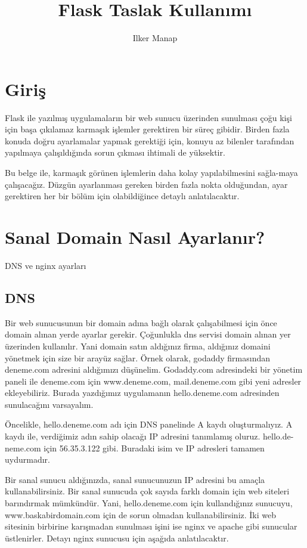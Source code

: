 \documentclass[10pt,a4paper]{book}
\author{Ilker Manap}
\title{Flask Taslak Kullanımı}
\begin{document}
\maketitle
\tableofcontents
\chapter{Giriş}

Flask ile yazılmış uygulamaların bir web sunucu üzerinden sunulması çoğu kişi 
için başa çıkılamaz karmaşık işlemler gerektiren bir süreç gibidir. Birden 
fazla konuda doğru ayarlamalar yapmak gerektiği için, konuyu az bilenler 
tarafından yapılmaya çalışıldığında sorun çıkması ihtimali de yüksektir.


Bu belge ile, karmaşık görünen işlemlerin daha kolay yapılabilmesini sağla-maya 
çalışacağız. Düzgün ayarlanması gereken birden fazla nokta olduğundan, ayar gerektiren her bir bölüm için olabildiğince detaylı anlatılacaktır.





\chapter{Sanal Domain Nasıl Ayarlanır?}
DNS ve nginx ayarları
\section{DNS}
Bir web sunucusunun bir domain adına bağlı olarak çalışabilmesi için önce domain
alınan yerde ayarlar gerekir. Çoğunlukla dns servisi domain alınan yer üzerinden 
kullanılır. Yani domain satın aldığınız firma, aldığınız domaini yönetmek için size bir arayüz sağlar. Örnek olarak, godaddy firmasından deneme.com adresini aldığımızı düşünelim. Godaddy.com adresindeki bir yönetim paneli ile deneme.com için www.deneme.com, mail.deneme.com gibi yeni adresler ekleyebiliriz. Burada yazdığımız uygulamanın  hello.deneme.com adresinden sunulacağını varsayalım. 

Öncelikle,  hello.deneme.com adı için DNS panelinde A kaydı oluşturmalıyız. A kaydı ile, verdiğimiz adın sahip olacağı IP adresini tanımlamış oluruz. hello.de-neme.com için 56.35.3.122 gibi. Buradaki isim ve IP adresleri tamamen uydurmadır. 


Bir sanal sunucu aldığınızda, sanal sunucunuzun IP adresini bu amaçla kullanabilirsiniz. Bir sanal sunucuda çok sayıda farklı domain için web siteleri barındırmak mümkündür. Yani, hello.deneme.com için kullandığınız sunucuyu,  www.baskabirdomain.com için de sorun olmadan kullanabilirsiniz. İki web sitesinin birbirine karışmadan sunulması işini ise nginx ve apache gibi sunucular üstlenirler. Detayı nginx sunucusu için aşağıda anlatılacaktır.
\end{document}
